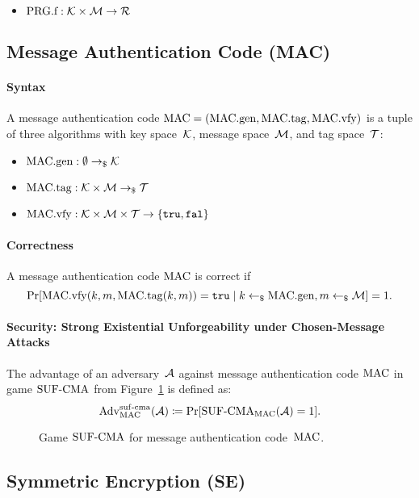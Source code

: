 \documentclass[a4paper,orivec]{llncs}
\begin{document}
\begin{itemize}
    \item $\mathrm{PRG}.\mathrm{f}: \mathcal{K}\times\mathcal{M} \to \mathcal{R}$
\end{itemize}

\subsection{Message Authentication Code (MAC)}

\paragraph{Syntax}
A message authentication code $\mathrm{MAC}=(\mathrm{MAC}.\mathrm{gen},\mathrm{MAC}.\mathrm{tag},\mathrm{MAC}.\mathrm{vfy})$ is a tuple of three algorithms with key space~$\mathcal{K}$, message space~$\mathcal{M}$, and tag space~$\mathcal{T}$:

\begin{itemize}
    \item $\mathrm{MAC}.\mathrm{gen}: \emptyset \to_\$ \mathcal{K}$
    \item $\mathrm{MAC}.\mathrm{tag}: \mathcal{K}\times\mathcal{M} \to_\$ \mathcal{T}$
    \item $\mathrm{MAC}.\mathrm{vfy}: \mathcal{K}\times\mathcal{M}\times\mathcal{T} \to \{\mathtt{tru},\mathtt{fal}\}$
\end{itemize}

\paragraph{Correctness}
A message authentication code $\mathrm{MAC}$ is correct if
\[
\Pr[\mathrm{MAC}.\mathrm{vfy}(k,m,\mathrm{MAC}.\mathrm{tag}(k,m))=\mathtt{tru}\mid k\gets_\$\mathrm{MAC}.\mathrm{gen},m\gets_\$\mathcal{M}]=1\text{.}
\]

\paragraph{Security: Strong Existential Unforgeability under Chosen-Message Attacks}
The advantage of an adversary~$\mathcal{A}$ against message authentication code $\mathrm{MAC}$ in game ${\mathrm{SUF}\text{-}\mathrm{CMA}}$ from Figure~\ref{fig:mac:suf} is defined as:
\[
\mathrm{Adv}_{\mathrm{MAC}}^{\mathrm{suf}\text{-}\mathrm{cma}}(\mathcal{A})\coloneqq\Pr[{\mathrm{SUF}\text{-}\mathrm{CMA}}_{\mathrm{MAC}}(\mathcal{A})=1]\text{.}
\]

\begin{figure}[!ht]
    \centering
    \nicoresetlinenr%
    \fbox{%
        \scalebox{\codescalefactor}{%
        }%
    }
    \caption{%
        Game ${\mathrm{SUF}\text{-}\mathrm{CMA}}$ for message authentication code~$\mathrm{MAC}$.
    }
    \label{fig:mac:suf}
\end{figure}


\subsection{Symmetric Encryption (SE)}
\end{document}
